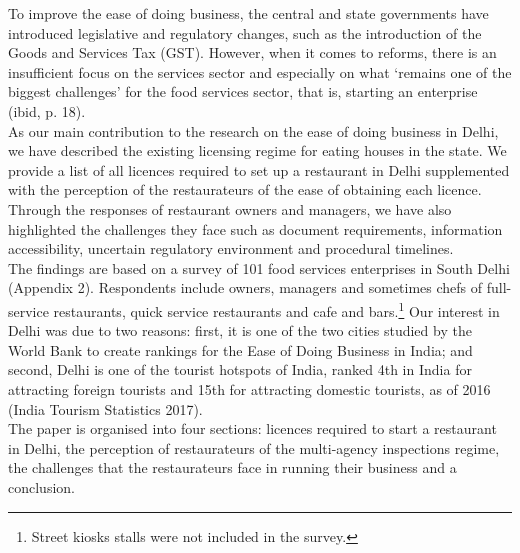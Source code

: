\documentclass[a4paper, 12pt]{article}
\begin{document}
                    To improve the ease of doing business, the central and state governments have introduced legislative and regulatory changes, such as the introduction of the Goods and Services Tax (GST). However, when it comes to reforms, there is an insufficient focus on the services sector and especially on what ‘remains one of the biggest challenges’ for the food services sector, that is, starting an enterprise (ibid, p. 18).\\
                    As our main contribution to the research on the ease of doing business in Delhi, we have described the existing licensing regime for eating houses in the state. We provide a list of all licences required to set up a restaurant in Delhi supplemented with the perception of the restaurateurs of the ease of obtaining each licence. Through the responses of restaurant owners and managers, we have also highlighted the challenges they face such as document requirements, information accessibility, uncertain regulatory environment and procedural timelines.\\
                    The findings are based on a survey of 101 food services enterprises in South Delhi (Appendix 2). Respondents include owners, managers and sometimes chefs of full-service restaurants, quick service restaurants and cafe and bars.\footnote{Street kiosks stalls were not included in the survey.} Our interest in Delhi was due to two reasons: first, it is one of the two cities studied by the World Bank to create rankings for the Ease of Doing Business in India; and second, Delhi is one of the tourist hotspots of India, ranked 4th in India for attracting foreign tourists and 15th for attracting domestic tourists, as of 2016 (India Tourism Statistics 2017).\\
                    The paper is organised into four sections: licences required to start a restaurant in Delhi, the perception of restaurateurs of the multi-agency inspections regime, the challenges that the restaurateurs face in running their business and a conclusion. 
            
                                        
\end{document}
